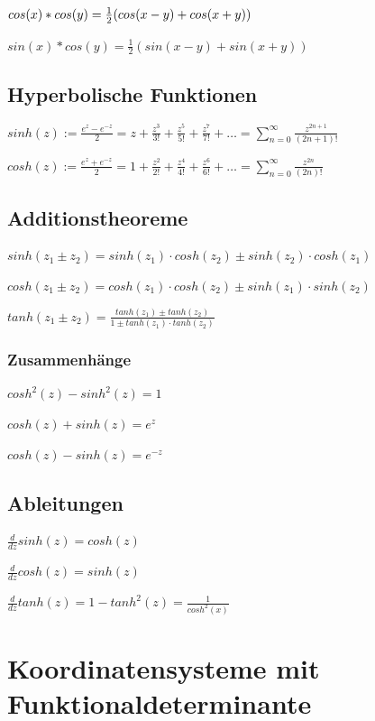 $cos(x)*cos(y) = \frac{1}{2}(cos(x-y)+cos(x+y))$

$sin(x)*cos(y) = \frac{1}{2}(sin(x-y)+sin(x+y))$ \\



\subsection{Hyperbolische Funktionen}
$sinh(z) := \frac{e^z - e^{-z}}{2} = z + \frac{z^3}{3!} + \frac{z^5}{5!} + \frac{z^7}{7!} + \dots = \sum_{n=0}^\infty \frac{z^{2n+1}}{(2n+1)!}$

$cosh(z) := \frac{e^z + e^{-z}}{2}= 1 + \frac{z^2}{2!} + \frac{z^4}{4!} + \frac{z^6}{6!} + \dots = \sum_{n=0}^\infty \frac{z^{2n}}{(2n)!}$


\subsection{Additionstheoreme}
$sinh(z_1 \pm z_2) = sinh(z_1) \cdot cosh(z_2) \pm sinh(z_2) \cdot cosh(z_1)$

$cosh(z_1 \pm z_2) = cosh(z_1) \cdot cosh(z_2) \pm sinh(z_1) \cdot sinh(z_2)$

$tanh(z_1 \pm z_2) = \frac{tanh(z_1) \pm tanh(z_2)}{1 \pm tanh(z_1) \cdot tanh(z_2)}$


\subsubsection{Zusammenhänge}
$cosh^2(z) - sinh^2(z) = 1$

$cosh(z) + sinh(z) = e^z$

$cosh(z) - sinh(z) = e^{-z}$

\subsection{Ableitungen}
$\frac{d}{dz}sinh(z) = cosh(z)$

$\frac{d}{dz}cosh(z) = sinh(z)$

$\frac{d}{dz}tanh(z) = 1 -tanh^2(z) = \frac{1}{cosh^2(x)}$



\section{Koordinatensysteme mit Funktionaldeterminante}

